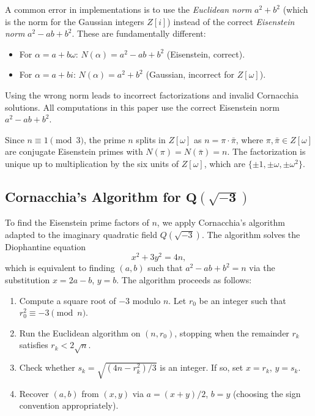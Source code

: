 \documentclass[11pt,a4paper]{article}
\theoremstyle{definition}
\begin{document}
\begin{tcolorbox}[colback=red!5,colframe=red!75!black,title={Critical Note: Eisenstein Norm vs.\ Euclidean Norm}]
  A common error in implementations is to use the \emph{Euclidean norm} $a^2 + b^2$ (which is the norm for the Gaussian integers $Z[i]$) instead of the correct \emph{Eisenstein norm} $a^2 - ab + b^2$. These are fundamentally different:
  \begin{itemize}
    \item For $\alpha = a + b\omega$: $N(\alpha) = a^2 - ab + b^2$ \quad (Eisenstein, correct).
    \item For $\alpha = a + bi$: $N(\alpha) = a^2 + b^2$ \quad (Gaussian, incorrect for $Z[\omega]$).
  \end{itemize}
  Using the wrong norm leads to incorrect factorizations and invalid Cornacchia solutions. All computations in this paper use the correct Eisenstein norm $a^2 - ab + b^2$.
\end{tcolorbox}

Since $n \equiv 1 \pmod{3}$, the prime $n$ splits in $Z[\omega]$ as $n = \pi \cdot \bar{\pi}$, where $\pi, \bar{\pi} \in Z[\omega]$ are conjugate Eisenstein primes with $N(\pi) = N(\bar{\pi}) = n$. The factorization is unique up to multiplication by the six units of $Z[\omega]$, which are $\{\pm 1, \pm \omega, \pm \omega^2\}$.

\subsection{Cornacchia's Algorithm for $\mathbf{Q(\sqrt{-3})}$}

To find the Eisenstein prime factors of $n$, we apply Cornacchia's algorithm adapted to the imaginary quadratic field $Q(\sqrt{-3})$. The algorithm solves the Diophantine equation
\begin{equation}
  x^2 + 3y^2 = 4n,
  \label{eq:cornacchia-target}
\end{equation}
which is equivalent to finding $(a, b)$ such that $a^2 - ab + b^2 = n$ via the substitution $x = 2a - b$, $y = b$. The algorithm proceeds as follows:

\begin{enumerate}
  \item Compute a square root of $-3$ modulo $n$. Let $r_0$ be an integer such that $r_0^2 \equiv -3 \pmod{n}$.
  \item Run the Euclidean algorithm on $(n, r_0)$, stopping when the remainder $r_k$ satisfies $r_k < 2\sqrt{n}$.
  \item Check whether $s_k = \sqrt{(4n - r_k^2)/3}$ is an integer. If so, set $x = r_k$, $y = s_k$.
  \item Recover $(a, b)$ from $(x, y)$ via $a = (x + y)/2$, $b = y$ (choosing the sign convention appropriately).
\end{enumerate}
\end{document}
